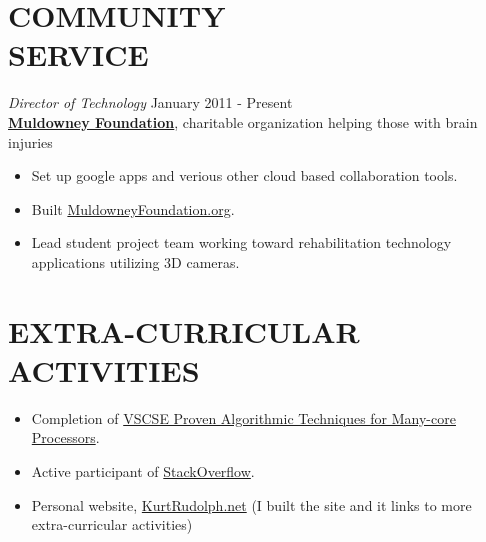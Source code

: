 \documentclass[margin]{res}
\begin{document}
\begin{resume}
\section{COMMUNITY \\ SERVICE}  
  {\sl Director of Technology} \hfill January 2011 - Present \\
  {\bf \href{http://www.muldowneyfoundation.org/}{Muldowney Foundation}}, 
    charitable organization helping those with brain injuries
    \begin{itemize}
      \itemsep -2pt %
      \item Set up google apps and verious other cloud based collaboration tools.
      \item Built \href{http://www.muldowneyfoundation.org/}{MuldowneyFoundation.org}.
      \item Lead student project team working toward
          rehabilitation technology applications utilizing 3D cameras.
    \end{itemize}

\section{EXTRA-CURRICULAR \\ ACTIVITIES}             
  \begin{itemize}
    \itemsep -2pt %
    \item Completion of \href{http://www.vscse.org/summerschool/2012/manycore.html}
          {VSCSE Proven Algorithmic Techniques for Many-core Processors}.
    \item Active participant of \href{http://stackoverflow.com/users/1134742/rudolph9}{StackOverflow}.
    \item Personal website, \href{http://kurtrudolph.net/about.html}{KurtRudolph.net} (I built the site and it links to more extra-curricular activities)
  \end{itemize}
  
 

\end{resume}
\end{document}
